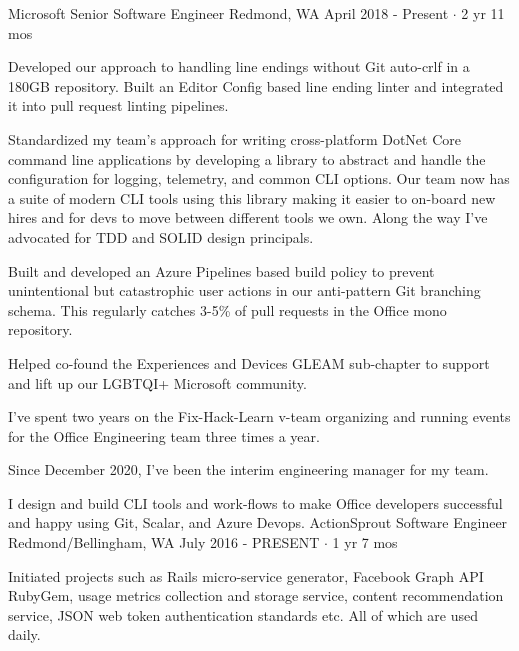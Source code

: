 \documentclass[11pt, a4paper]{awesome-cv}
\begin{document}
\begin{cventries}

  \cventry
    {Microsoft}
    {Senior Software Engineer}
    {Redmond, WA}
    {April 2018 - Present $\cdot$ 2 yr 11 mos }
    {
      \begin{cvitems}
        \item Developed our approach to handling line endings without Git auto-crlf in a 180GB repository. Built an Editor Config based line ending linter and integrated it into pull request linting pipelines.
        \item Standardized my team's approach for writing cross-platform DotNet Core command line applications by developing a library to abstract and handle the configuration for logging, telemetry, and common CLI options. Our team now has a suite of modern CLI tools using this library making it easier to on-board new hires and for devs to move between different tools we own. Along the way I've advocated for TDD and SOLID design principals.
        \item Built and developed an Azure Pipelines based build policy to prevent unintentional but catastrophic user actions in our anti-pattern Git branching schema. This regularly catches 3-5\% of pull requests in the Office mono repository.
        \item Helped co-found the Experiences and Devices GLEAM sub-chapter to support and lift up our LGBTQI+ Microsoft community. 
        \item I've spent two years on the Fix-Hack-Learn v-team organizing and running events for the Office Engineering team three times a year.
        \item Since December 2020, I've been the interim engineering manager for my team.
      \end{cvitems}
    }
    {
      I design and build CLI tools and work-flows to make Office developers successful and happy using Git, Scalar, and Azure Devops. 
    }
  \cventry
    {ActionSprout} %
    {Software Engineer} %
    {Redmond/Bellingham, WA} %
    {July 2016 - PRESENT $\cdot$ 1 yr 7 mos} %
    {
      \begin{cvitems} %
        \item Initiated projects such as Rails micro-service generator, Facebook Graph API RubyGem, usage metrics collection and storage service, content recommendation service, JSON web token authentication standards etc. All of which are used daily.

\end{cvitems}}
\end{cventries}
\end{document}
